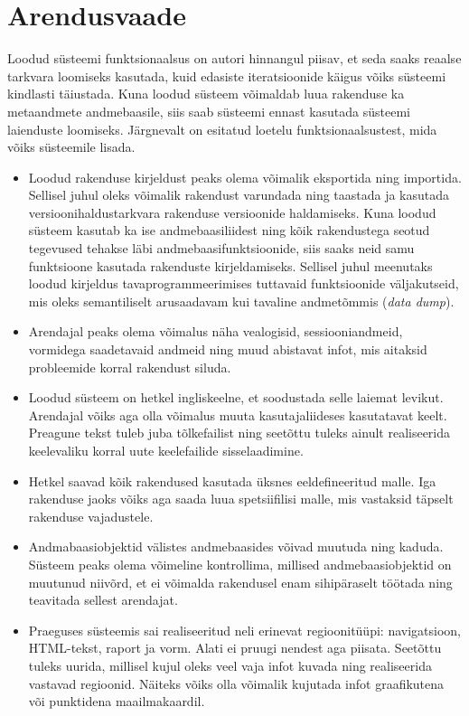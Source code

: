 \documentclass[a4paper,12pt]{article} %
\begin{document}
\section{Arendusvaade}
Loodud süsteemi funktsionaalsus on autori hinnangul piisav, et seda saaks reaalse tarkvara loomiseks kasutada, kuid edasiste iteratsioonide käigus võiks süsteemi kindlasti täiustada.
Kuna loodud süsteem võimaldab luua rakenduse ka metaandmete andmebaasile, siis saab süsteemi ennast kasutada süsteemi laienduste loomiseks.
Järgnevalt on esitatud loetelu funktsionaalsustest, mida võiks süsteemile lisada.
\begin{itemize}
\item Loodud rakenduse kirjeldust peaks olema võimalik eksportida ning importida. Sellisel juhul oleks võimalik rakendust varundada ning taastada ja kasutada versioonihaldustarkvara rakenduse versioonide haldamiseks. Kuna loodud süsteem kasutab ka ise andmebaasiliidest ning kõik rakendustega seotud tegevused tehakse läbi andmebaasifunktsioonide, siis saaks neid samu funktsioone kasutada rakenduste kirjeldamiseks. Sellisel juhul meenutaks loodud kirjeldus tavaprogrammeerimises tuttavaid funktsioonide väljakutseid, mis oleks semantiliselt arusaadavam kui tavaline andmetõmmis (\textit{data dump}).
\item Arendajal peaks olema võimalus näha vealogisid, sessiooniandmeid, vormidega saadetavaid andmeid ning muud abistavat infot, mis aitaksid probleemide korral rakendust siluda.
\item Loodud süsteem on hetkel ingliskeelne, et soodustada selle laiemat levikut. Arendajal võiks aga olla võimalus muuta kasutajaliideses kasutatavat keelt. Preagune tekst tuleb juba tõlkefailist ning seetõttu tuleks ainult realiseerida keelevaliku korral uute keelefailide sisselaadimine.
\item Hetkel saavad kõik rakendused kasutada üksnes eeldefineeritud malle. Iga rakenduse jaoks võiks aga saada luua spetsiifilisi malle, mis vastaksid täpselt rakenduse vajadustele.
\item Andmabaasiobjektid välistes andmebaasides võivad muutuda ning kaduda. Süsteem peaks olema võimeline kontrollima, millised andmebaasiobjektid on muutunud niivõrd, et ei võimalda rakendusel enam sihipäraselt töötada ning teavitada sellest arendajat.
\item Praeguses süsteemis sai realiseeritud neli erinevat regioonitüüpi: navigatsioon, HTML-tekst, raport ja vorm. Alati ei pruugi nendest aga piisata. Seetõttu tuleks uurida, millisel kujul oleks veel vaja infot kuvada ning realiseerida vastavad regioonid. Näiteks võiks olla võimalik kujutada infot graafikutena või punktidena maailmakaardil.

\end{itemize}
\end{document}
